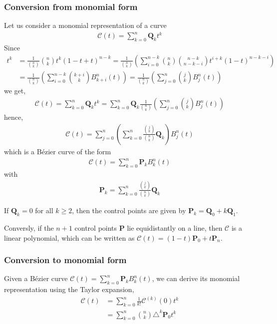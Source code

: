 \subsubsection*{Conversion from monomial form}
Let us consider a monomial representation of a curve 
\begin{align*}
\mathcal{C}(t) = \sum_{k=0}^n \mathbf{Q}_k t^k 
\end{align*}
Since
\begin{align*}
  t^k &= \frac{1}{\binom{n}{k}} \binom{n}{k} t^k \left(1-t+t \right)^{n-k} 
      = \frac{1}{\binom{n}{k}} \left( \sum\limits_{i=0}^{n-k} \binom{n}{k} \binom{n-k}{n-k-i} t^{i+k} \left( 1-t \right)^{n-k-i} \right) \\
      &= \frac{1}{\binom{n}{k}} \left(  \sum\limits_{i=0}^{n-k} \binom{k+i}{k} B_{k+i}^n(t) \right)
      = \frac{1}{\binom{n}{k}} \left(  \sum\limits_{j=0}^{n} \binom{j}{k} B_{j}^n(t) \right) 
\end{align*}
we get,
\begin{align*}
\mathcal{C}(t) = \sum_{k=0}^n \mathbf{Q}_k t^k = \sum_{k=0}^n \mathbf{Q}_k \frac{1}{\binom{n}{k}} \left(  \sum\limits_{j=0}^{n} \binom{j}{k} B_{j}^n(t) \right)  
\end{align*}
hence,
\begin{align*}
\mathcal{C}(t) = \sum_{j=0}^n \left(\sum\limits_{k=0}^{n} \frac{\binom{j}{k}}{\binom{n}{k}} \mathbf{Q}_k \right) B_{j}^n(t)  
\end{align*}
which is a B\'ezier curve of the form
\begin{align*}
\mathcal{C}(t) = \sum_{k=0}^n \mathbf{P}_k B_k^n(t)
\end{align*}
with 
\begin{align*}
\mathbf{P}_k =  \sum\limits_{k=0}^{n} \frac{\binom{j}{k}}{\binom{n}{k}} \mathbf{Q}_k 
\end{align*}
\begin{remark}
  If $\mathbf{Q}_k = 0$ for all $k \geq 2$, then the control points are given by $\mathbf{P}_k = \mathbf{Q}_0 + k \mathbf{Q}_1$.
\end{remark}
\begin{proposition}
  Conversly, if the $n+1$ control points $\mathbf{P}$ lie equidistantly on a line, then $\mathcal{C}$ is a linear polynomial, which can be written as $\mathcal{C}(t) = \left(1-t\right) \mathbf{P}_0 + t \mathbf{P}_n$. 
\end{proposition}
\subsubsection*{Conversion to monomial form}
Given a B\'ezier curve $\mathcal{C}(t) = \sum_{k=0}^n \mathbf{P}_k B_k^n(t)$, we can derive its monomial representation using the Taylor expansion,
\begin{align*}
  \mathcal{C}(t) &= \sum\limits_{k=0}^n \frac{1}{k!}\mathcal{C}^{(k)}(0) t^k \\
                 &= \sum\limits_{k=0}^n \binom{n}{k} \triangle^k \mathbf{P}_0 t^k  
\end{align*}

